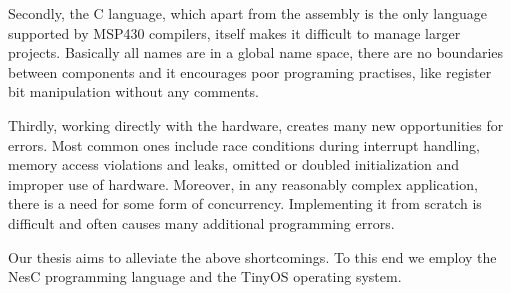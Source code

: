 Secondly, the C language, which apart from the assembly is the only
language supported by MSP430 compilers,  itself makes it difficult to
manage larger projects. Basically all names are in a global name
space, there are no boundaries between components and it encourages
poor programing practises, like register bit manipulation without any
comments.

Thirdly, working directly with the hardware, creates many new
opportunities for errors. Most common ones include race conditions during
interrupt handling, memory access violations and leaks, omitted or
doubled initialization and improper use of hardware.  Moreover, in any
reasonably complex application, there is a need for some form of
concurrency.  Implementing it from scratch is difficult and often
causes many additional programming errors.

Our thesis aims to alleviate the above shortcomings. To this end we
employ the NesC programming language and the TinyOS operating system.


